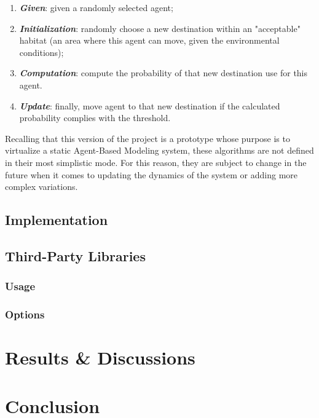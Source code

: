 \begin{enumerate}
    \item \textbf{\textit{Given}}: given a randomly selected agent;
    \item \textbf{\textit{Initialization}}: randomly choose a new destination within an "acceptable" habitat (an area where this agent can move, given the environmental conditions);
    \item \textbf{\textit{Computation}}: compute the probability of that new destination use for this agent.
    \item \textbf{\textit{Update}}: finally, move agent to that new destination if the calculated probability complies with the threshold.
\end{enumerate}

Recalling that this version of the project is a prototype whose purpose is to virtualize a static Agent-Based Modeling system, these algorithms are not defined in their most simplistic mode. For this reason, they are subject to change in the future when it comes to updating the dynamics of the system or adding more complex variations.

\subsection{Implementation}

\subsection{Third-Party Libraries}

\subsubsection{Usage}
\subsubsection{Options}

\section{Results \& Discussions}

\section{Conclusion}

